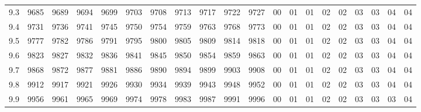 \documentclass[12pt,UTF8,fontset=none]{ctexbook}
\begin{document}
\begin{appendix}
\begin{longtable}{|c| c c c c c | c c c c c| c c c c c c c c c|}
\scriptsize 9.3 & \scriptsize 9685 & \scriptsize 9689 & \scriptsize 9694 & \scriptsize 9699 & \scriptsize 9703 & \scriptsize 9708 & \scriptsize 9713 & \scriptsize 9717 & \scriptsize 9722 & \scriptsize 9727 & \scriptsize 00 & \scriptsize 01 & \scriptsize 01 & \scriptsize 02 & \scriptsize 02 & \scriptsize 03 & \scriptsize 03 & \scriptsize 04 & \scriptsize 04 \\
\scriptsize 9.4 & \scriptsize 9731 & \scriptsize 9736 & \scriptsize 9741 & \scriptsize 9745 & \scriptsize 9750 & \scriptsize 9754 & \scriptsize 9759 & \scriptsize 9763 & \scriptsize 9768 & \scriptsize 9773 & \scriptsize 00 & \scriptsize 01 & \scriptsize 01 & \scriptsize 02 & \scriptsize 02 & \scriptsize 03 & \scriptsize 03 & \scriptsize 04 & \scriptsize 04 \\
\scriptsize 9.5 & \scriptsize 9777 & \scriptsize 9782 & \scriptsize 9786 & \scriptsize 9791 & \scriptsize 9795 & \scriptsize 9800 & \scriptsize 9805 & \scriptsize 9809 & \scriptsize 9814 & \scriptsize 9818 & \scriptsize 00 & \scriptsize 01 & \scriptsize 01 & \scriptsize 02 & \scriptsize 02 & \scriptsize 03 & \scriptsize 03 & \scriptsize 04 & \scriptsize 04 \\
\scriptsize 9.6 & \scriptsize 9823 & \scriptsize 9827 & \scriptsize 9832 & \scriptsize 9836 & \scriptsize 9841 & \scriptsize 9845 & \scriptsize 9850 & \scriptsize 9854 & \scriptsize 9859 & \scriptsize 9863 & \scriptsize 00 & \scriptsize 01 & \scriptsize 01 & \scriptsize 02 & \scriptsize 02 & \scriptsize 03 & \scriptsize 03 & \scriptsize 04 & \scriptsize 04 \\
\scriptsize 9.7 & \scriptsize 9868 & \scriptsize 9872 & \scriptsize 9877 & \scriptsize 9881 & \scriptsize 9886 & \scriptsize 9890 & \scriptsize 9894 & \scriptsize 9899 & \scriptsize 9903 & \scriptsize 9908 & \scriptsize 00 & \scriptsize 01 & \scriptsize 01 & \scriptsize 02 & \scriptsize 02 & \scriptsize 03 & \scriptsize 03 & \scriptsize 04 & \scriptsize 04 \\
\scriptsize 9.8 & \scriptsize 9912 & \scriptsize 9917 & \scriptsize 9921 & \scriptsize 9926 & \scriptsize 9930 & \scriptsize 9934 & \scriptsize 9939 & \scriptsize 9943 & \scriptsize 9948 & \scriptsize 9952 & \scriptsize 00 & \scriptsize 01 & \scriptsize 01 & \scriptsize 02 & \scriptsize 02 & \scriptsize 03 & \scriptsize 03 & \scriptsize 04 & \scriptsize 04 \\
\scriptsize 9.9 & \scriptsize 9956 & \scriptsize 9961 & \scriptsize 9965 & \scriptsize 9969 & \scriptsize 9974 & \scriptsize 9978 & \scriptsize 9983 & \scriptsize 9987 & \scriptsize 9991 & \scriptsize 9996 & \scriptsize 00 & \scriptsize 01 & \scriptsize 01 & \scriptsize 02 & \scriptsize 02 & \scriptsize 03 & \scriptsize 03 & \scriptsize 03 & \scriptsize 04 \\
\hline
\end{longtable}


\end{appendix}
\end{document}
